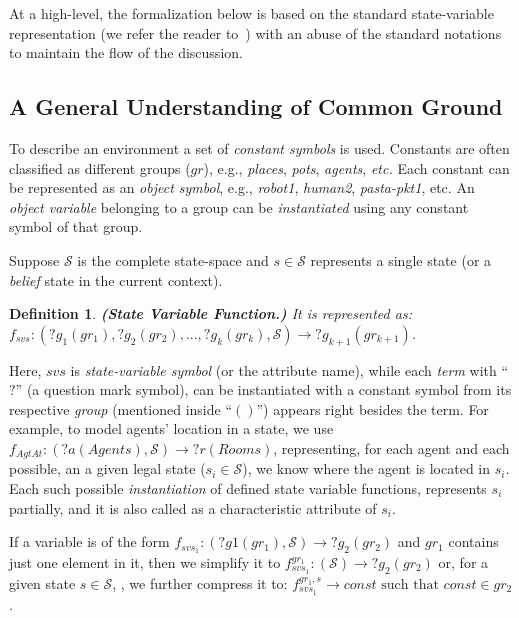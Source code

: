 \documentclass[letterpaper]{article} %
\newtheorem{definition}{Definition}
\begin{document}
At a high-level, the formalization below is based on the standard state-variable representation (we refer the reader to~\cite{naubooks0014222}) with an abuse of the standard notations to maintain the flow of the discussion.

\subsection{A General Understanding of Common Ground}
To describe an environment a set of \textit{constant symbols} is used. 
Constants are often classified as different groups ($gr$), e.g., \textit{places}, \textit{pots}, \textit{agents}, \textit{etc.} 
Each constant can be represented as an \textit{object symbol}, e.g., \textit{robot1}, \textit{human2}, \textit{pasta-pkt1}, etc. 
An \textit{object variable} belonging to a group can be \textit{instantiated} using any constant symbol of that group.

Suppose $\mathcal{S}$ is the complete state-space and $s \in \mathcal{S}$ represents a single state (or a \textit{belief} state in the current context).  


\begin{definition}
\textbf{(State Variable Function.)} It is represented as: $f_{svs}:(?g_1 (gr_1), ?g_2 (gr_2), ..., ?g_k (gr_k),\mathcal{S})\rightarrow ?g_{k+1} (gr_{k+1})$. 
\end{definition}
Here, $svs$ is \textit{state-variable symbol} (or the attribute name), while each \textit{term} with ``$?$'' (a question mark symbol), can be instantiated with a constant symbol from its respective \textit{group} (mentioned inside ``$()$'') appears right besides the term. 
For example, to model agents' location in a state, we use $f_{\textit{AgtAt}}:(?a (Agents), \mathcal{S}) \rightarrow ?r (Rooms)$, representing, for each agent and each possible, an a given legal state ($s_i \in \mathcal{S}$), we know where the agent is located in $s_i$. 
Each such possible \textit{instantiation} of defined state variable functions, represents $s_i$ partially, and it is also called as a characteristic attribute of $s_i$.     

If a variable is of the form $f_{svs_1}: (?g1 (gr_1), \mathcal{S}) \rightarrow ?g_2 (gr_2)$ and $gr_1$ contains just one element in it, then we simplify it to $f_{svs_1}^{gr_1}: (\mathcal{S}) \rightarrow ?g_2 (gr_2)$ or, for a given state $s \in \mathcal{S}$, , we further compress it to: $f_{svs_1}^{gr_1,s} \rightarrow const \text{ such that } const \in gr_2$. 
\end{document}
